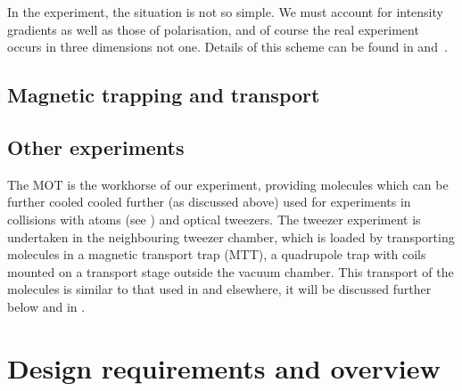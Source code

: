 
In the \CaF{} experiment, the situation is not so simple. We must account for
intensity gradients as well as those of polarisation, and of course the real
experiment occurs in three dimensions not one. Details of this scheme can be
found in  and~\cite{Truppe2017}.

\subsection*{Magnetic trapping and transport}


\subsection*{Other experiments}

The \CaF{} MOT is the workhorse of our experiment, providing molecules which
can be further cooled cooled further (as discussed above) used for experiments
in collisions with \Rb{} atoms (see ) and optical tweezers. The tweezer experiment is
undertaken in the neighbouring tweezer chamber, which is loaded by transporting
molecules in a magnetic transport trap (MTT), a quadrupole trap with coils
mounted on a transport stage outside the vacuum chamber. This transport of the
molecules is similar to that used in
 and elsewhere, it will be
discussed further below and in .


\section{Design requirements and overview}


